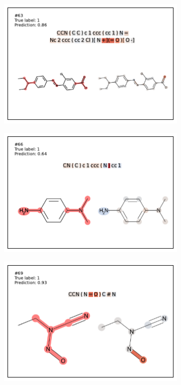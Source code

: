 \begin{figure}
\begin{subfigure}[b]{0.33\textwidth}
\end{subfigure} 
\begin{subfigure}[b]{0.33\textwidth} 
  \centering 
  \includegraphics[width=\textwidth]{figures/ames/ames63.pdf} 
\end{subfigure}\begin{subfigure}[b]{0.33\textwidth} 
  \centering 
  \includegraphics[width=\textwidth]{figures/ames/ames66.pdf} 
\end{subfigure}\begin{subfigure}[b]{0.33\textwidth} 
  \centering 
  \includegraphics[width=\textwidth]{figures/ames/ames69.pdf} 

\end{subfigure}
\end{figure}
